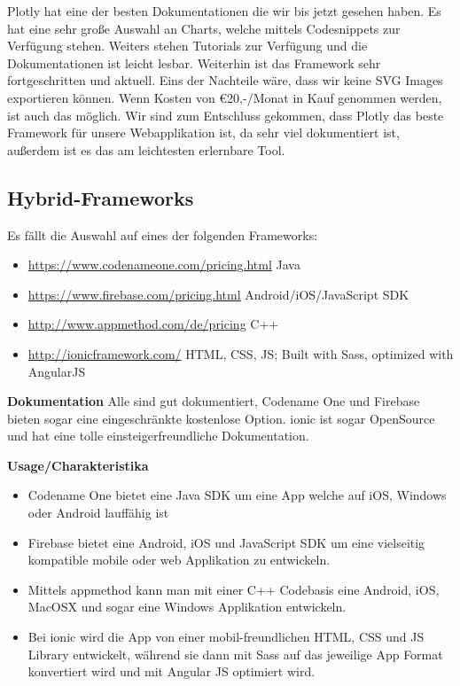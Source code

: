Plotly hat eine der besten Dokumentationen die wir bis jetzt gesehen haben. Es hat eine sehr große Auswahl an Charts, welche mittels Codesnippets zur Verfügung stehen. 
Weiters stehen Tutorials zur Verfügung und die Dokumentationen ist leicht lesbar. Weiterhin ist das Framework sehr fortgeschritten und aktuell.                  
Eins der Nachteile wäre, dass wir keine SVG Images exportieren können. Wenn Kosten von €20,-/Monat in Kauf genommen werden, ist auch das möglich. 
Wir sind zum Entschluss gekommen, dass Plotly das beste Framework für unsere Webapplikation ist, da sehr viel dokumentiert ist, außerdem ist es das am leichtesten erlernbare Tool.


\clearpage
\subsection{Hybrid-Frameworks}
	Es fällt die Auswahl auf eines der folgenden Frameworks:
	\begin{itemize}
	\item \hyperref[Codename One]{https://www.codenameone.com/pricing.html} Java
	\item \hyperref[Firebase]{https://www.firebase.com/pricing.html} Android/iOS/JavaScript SDK
	\item \hyperref[appmethod]{http://www.appmethod.com/de/pricing} C++
	\item \hyperref[ionic]{http://ionicframework.com/} HTML, CSS, JS; Built with Sass, optimized with AngularJS
\end{itemize}

\textbf{Dokumentation\newline}
Alle sind gut dokumentiert, Codename One und Firebase bieten sogar eine eingeschränkte kostenlose Option.
ionic ist sogar OpenSource und hat eine tolle einsteigerfreundliche Dokumentation.

\textbf{Usage/Charakteristika}
\begin{itemize}
	\item Codename One bietet eine Java SDK um eine App welche auf iOS, Windows oder Android lauffähig ist
	\item Firebase bietet eine Android, iOS und JavaScript SDK um eine vielseitig kompatible mobile oder web Applikation zu entwickeln. 
	\item Mittels appmethod kann man mit einer C++ Codebasis eine Android, iOS, MacOSX und sogar eine Windows Applikation entwickeln.
	\item Bei ionic wird die App von einer mobil-freundlichen HTML, CSS und JS Library entwickelt, während sie dann mit Sass auf das jeweilige App Format konvertiert wird und mit Angular JS optimiert wird. 
\end{itemize}

